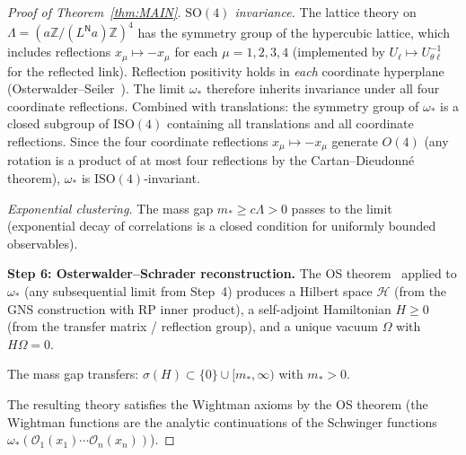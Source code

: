 \documentclass[11pt,a4paper]{article}
\theoremstyle{plain}
\theoremstyle{definition}
\theoremstyle{remark}
\newcommand{\Z}{\mathbb{Z}}
\newcommand{\SO}{\mathrm{SO}}
\newcommand{\ISO}{\mathrm{ISO}}
\newcommand{\cH}{\mathcal{H}}
\newcommand{\cO}{\mathcal{O}}
\begin{document}
\begin{proof}[Proof of Theorem~\ref{thm:MAIN}]
\emph{$\SO(4)$ invariance.} The lattice theory on
$\Lambda = (a\Z/(L^{\mathsf{N}}a)\Z)^4$ has the symmetry group of
the hypercubic lattice, which includes reflections
$x_\mu \mapsto -x_\mu$ for each $\mu = 1,2,3,4$
(implemented by $U_\ell \mapsto U_{\theta\ell}^{-1}$
for the reflected link). Reflection positivity holds in
\emph{each} coordinate hyperplane
(Osterwalder--Seiler~\cite{OS78}). The limit $\omega_*$
therefore inherits invariance under all four coordinate
reflections. Combined with translations: the symmetry
group of $\omega_*$ is a closed subgroup of $\ISO(4)$
containing all translations and all coordinate reflections.
Since the four coordinate reflections $x_\mu \mapsto -x_\mu$
generate $O(4)$ (any rotation is a product of at most
four reflections by the Cartan--Dieudonn\'e theorem),
$\omega_*$ is $\ISO(4)$-invariant.

\emph{Exponential clustering.} The mass gap
$m_* \ge c\Lambda > 0$ passes to the limit (exponential
decay of correlations is a closed condition for uniformly
bounded observables).

\medskip\noindent
\textbf{Step 6: Osterwalder--Schrader reconstruction.}
The OS theorem~\cite{OS78} applied to $\omega_*$
(any subsequential limit from Step~4)
produces a Hilbert space $\cH$ (from the GNS construction
with RP inner product), a self-adjoint Hamiltonian
$H \ge 0$ (from the transfer matrix / reflection group),
and a unique vacuum $\Omega$ with $H\Omega = 0$.

The mass gap transfers:
$\sigma(H) \subset \{0\} \cup [m_*, \infty)$ with
$m_* > 0$.

The resulting theory satisfies the Wightman axioms
by the OS theorem (the Wightman functions are the
analytic continuations of the Schwinger functions
$\omega_*(\cO_1(x_1)\cdots\cO_n(x_n))$).
\end{proof}
\end{document}
